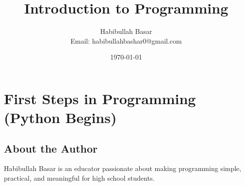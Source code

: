 \documentclass[a4paper,12pt]{book}
\title{\textbf{Introduction to Programming}}
\author{Habibullah Basar \\ \small{Email: habibullahbashar0@gmail.com}}
\date{\today}
\begin{document}
\frontmatter

\maketitle
\thispagestyle{empty}
\newpage

\tableofcontents
\newpage



\mainmatter





\part{First Steps in Programming (Python Begins)}















\appendix



\backmatter

\chapter*{About the Author}

Habibullah Basar is an educator passionate about making programming simple,
practical, and meaningful for high school students.
\end{document}

